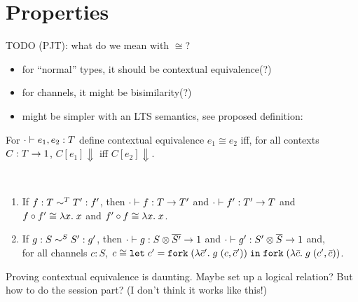 
\section{Properties}
\label{sec:properties}

TODO (PJT): what do we mean with $\cong$?
\begin{itemize}
\item for ``normal'' types, it should be contextual equivalence(?)
\item for channels, it might be bisimilarity(?)
\item might be simpler with an LTS semantics, see proposed definition:
\end{itemize}

\begin{definition}
  For $\typingE[\CNil]{e_1, e_2} T$ define contextual equivalence $e_1 \cong e_2$
  iff, for all contexts $C : T \to \TUnit$, $C[e_1] \Downarrow$ iff $C[e_2] \Downarrow$. 
\end{definition}

\begin{lemma}[Conversions]~\\[-\baselineskip]
  \begin{enumerate}
  \item If $f : T \eqt T' : f'$,
  then $\typingE[\CNil]{f}{\TFun T{T'}}$
  and  $\typingE[\CNil]{f'}{\TFun {T'}T}$
  and  $f \circ f' \cong \ELam x x$
  and  $f' \circ f \cong \ELam x x$.
\item If $g : S \eqs S' : g'$,
  then $\typingE[\CNil]{g}{\TFun {\TPair {S} {\TDual{S'}}} \TUnit}$
  and $\typingE[\CNil]{g'}{\TFun {\TPair {S'} {\TDual{S}}} \TUnit}$
  and,\\
  for all channels $c : S$,  $c \cong \ELet{c'}{\EFork{( \ELam {\bar c'} g \; (c, \bar c')) }}{\EFork{( \ELam {\bar c} g \; (c', \bar c)) }} $. 
\end{enumerate}
\end{lemma}

Proving contextual equivalence is daunting. Maybe set up a logical relation? But how to do the session part?
(I don't think it works like this!)

